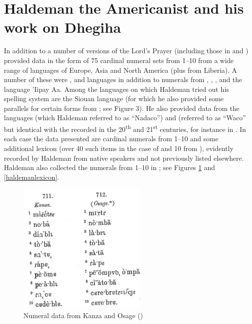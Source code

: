 \documentclass[output=paper]{LSP/langsci}
\begin{document}
\section{Haldeman the Americanist and his work on Dhegiha}  

 \largerpage[-1]
In addition to a number of versions of the Lord's Prayer (including those in  and ) \citet{Haldeman1860}  provided data in the form of 75 cardinal numeral sets from 1--10 from a wide range of languages of Europe, Asia and North America (plus  from Liberia).  A number of these were ,  and  languages in addition to numerals from , , ,  and the  language 'Iipay Aa. Among the languages on which Haldeman tried out his spelling system are the  Siouan language  (for which he also provided some  parallels for certain forms from \citealt{Riggs1852}; see Figure 3).  He also provided data from the  languages  (which Haldeman referred to as ``Nadaco'') and  (referred to as ``Waco'' but identical with the  recorded in the 20\textsuperscript{th} and 21\textsuperscript{st} centuries, for instance in \citet{Rood1975}. In each case the data presented are cardinal numerals from 1--10 and some additional lexicon (over 40 such items in the case of  and 10 from ), evidently recorded by Haldeman from native speakers and not previously listed elsewhere. Haldeman also collected the numerals from 1--10 in ; see Figures \ref{haldemannumerals} and \ref{haldemanlexicon}.   

\begin{figure}
\centering
\caption{Numeral data from {Kanza} and {Osage} (\citealt[146, \S711, 712]{Haldeman1860})} \label{haldemannumerals}
\includegraphics[width=2.5in,angle=-2]{figures/GrantNumerals.png}
\end{figure}
\end{document}
